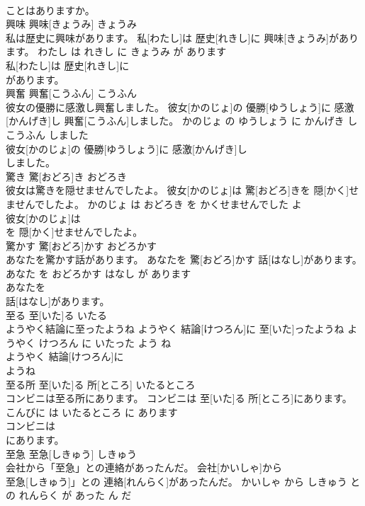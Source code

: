 \documentclass[8pt]{extreport}
\begin{document}
\begin{CJK}{UTF8}{min}
\\	ことはありますか。			
\\	興味	興味[きょうみ]	きょうみ	
\\	私は歴史に興味があります。	私[わたし]は 歴史[れきし]に 興味[きょうみ]があります。	わたし は れきし に きょうみ が あります	
\\	私[わたし]は 歴史[れきし]に
\\	があります。			
\\	興奮	興奮[こうふん]	こうふん	
\\	彼女の優勝に感激し興奮しました。	彼女[かのじょ]の 優勝[ゆうしょう]に 感激[かんげき]し 興奮[こうふん]しました。	かのじょ の ゆうしょう に かんげき し こうふん しました	
\\	彼女[かのじょ]の 優勝[ゆうしょう]に 感激[かんげき]し
\\	しました。			
\\	驚き	驚[おどろ]き	おどろき	
\\	彼女は驚きを隠せませんでしたよ。	彼女[かのじょ]は 驚[おどろ]きを 隠[かく]せませんでしたよ。	かのじょ は おどろき を かくせませんでした よ	
\\	彼女[かのじょ]は
\\	を 隠[かく]せませんでしたよ。			
\\	驚かす	驚[おどろ]かす	おどろかす	
\\	あなたを驚かす話があります。	あなたを 驚[おどろ]かす 話[はなし]があります。	あなた を おどろかす はなし が あります	
\\	あなたを
\\	話[はなし]があります。			
\\	至る	至[いた]る	いたる	
\\	ようやく結論に至ったようね	ようやく 結論[けつろん]に 至[いた]ったようね	ようやく けつろん に いたった よう ね	
\\	ようやく 結論[けつろん]に
\\	ようね			
\\	至る所	至[いた]る 所[ところ]	いたるところ	
\\	コンビニは至る所にあります。	コンビニは 至[いた]る 所[ところ]にあります。	こんびに は いたるところ に あります	
\\	コンビニは
\\	にあります。			
\\	至急	至急[しきゅう]	しきゅう	
\\	会社から「至急」との連絡があったんだ。	会社[かいしゃ]から
\\	至急[しきゅう]」との 連絡[れんらく]があったんだ。	かいしゃ から しきゅう と の れんらく が あった ん だ	

\end{CJK}
\end{document}
